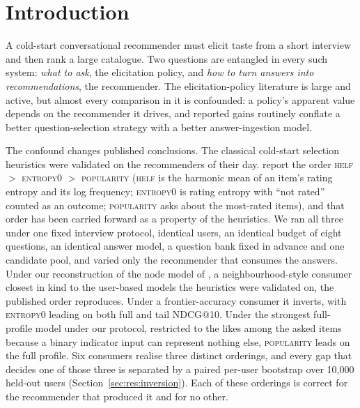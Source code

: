 \documentclass[manuscript,screen,review]{acmart}
\begin{document}

\maketitle

\section{Introduction}\label{sec:intro}

A cold-start conversational recommender must elicit taste from a short interview and then rank a large catalogue. Two questions are entangled in every such system: \emph{what to ask}, the elicitation policy, and \emph{how to turn answers into recommendations}, the recommender. The elicitation-policy literature is large and active, but almost every comparison in it is confounded: a policy's apparent value depends on the recommender it drives, and reported gains routinely conflate a better question-selection strategy with a better answer-ingestion model.

The confound changes published conclusions. The classical cold-start selection heuristics were validated on the recommenders of their day. \citet{rashid2008learning} report the order \textsc{helf} $>$ \textsc{entropy0} $>$ \textsc{popularity} (\textsc{helf} is the harmonic mean of an item's rating entropy and its log frequency; \textsc{entropy0} is rating entropy with ``not rated'' counted as an outcome; \textsc{popularity} asks about the most-rated items), and that order has been carried forward as a property of the heuristics. We ran all three under one fixed interview protocol, identical users, an identical budget of eight questions, an identical answer model, a question bank fixed in advance and one candidate pool, and varied only the recommender that consumes the answers. Under our reconstruction of the node model of \citet{golbandi2011adaptive}, a neighbourhood-style consumer closest in kind to the user-based models the heuristics were validated on, the published order reproduces. Under a frontier-accuracy consumer it inverts, with \textsc{entropy0} leading on both full and tail NDCG@10. Under the strongest full-profile model under our protocol, restricted to the likes among the asked items because a binary indicator input can represent nothing else, \textsc{popularity} leads on the full profile. Six consumers realise three distinct orderings, and every gap that decides one of those three is separated by a paired per-user bootstrap over 10,000 held-out users (Section~\ref{sec:res:inversion}). Each of these orderings is correct for the recommender that produced it and for no other.
\end{document}
